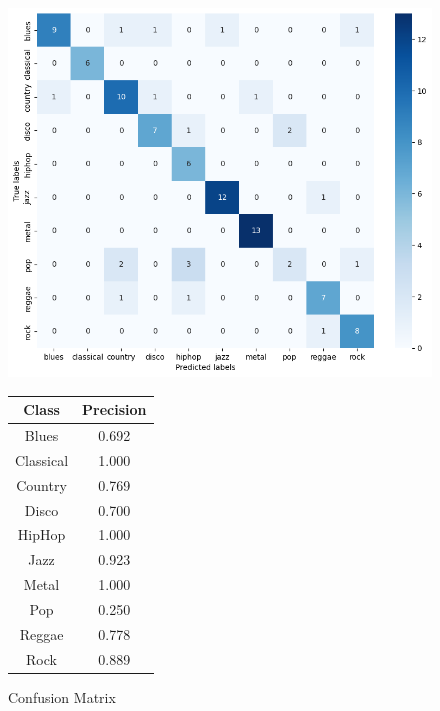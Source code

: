 \documentclass[a4paper,12pt]{article}
\begin{document}
\begin{figure}[H]
	\centering
	\begin{minipage}{0.5\textwidth}
		\centering
		\includegraphics[width=\textwidth, trim=0 0 50 0, clip]{final_results_confusion_mat.png}
		\caption{Confusion Matrix}
		\label{fig:confusion_mat}
	\end{minipage}%
	\begin{minipage}{0.45\textwidth}
		\centering
		\begin{tabular}{|c|c|}
			\hline
			\textbf{Class} & \textbf{Precision} \\
			\hline
			Blues & 0.692 \\
			Classical & 1.000 \\
			Country & 0.769 \\
			Disco & 0.700 \\
			HipHop & 1.000 \\
			Jazz & 0.923 \\
			Metal & 1.000 \\
			Pop & 0.250 \\
			Reggae & 0.778 \\
			Rock & 0.889 \\
			\hline
		\end{tabular}
		\label{tab:best_model_precision_per_class}
	\end{minipage}
\end{figure}
\end{document}
